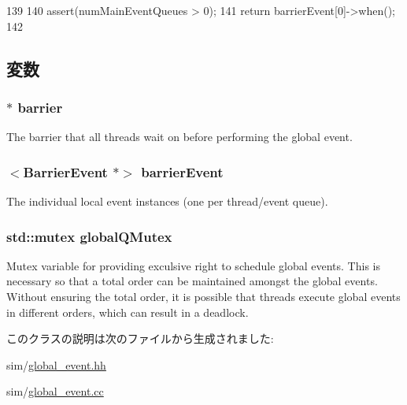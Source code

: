 \begin{DoxyCode}
139     {
140         assert(numMainEventQueues > 0);
141         return barrierEvent[0]->when();
142     }
\end{DoxyCode}


\subsection{変数}
\hypertarget{classBaseGlobalEvent_aa7d3601dfe4f1448143811e57bd9ca46}{
\subsubsection[{barrier}]{$\ast$ {\bf barrier}}}
\label{classBaseGlobalEvent_aa7d3601dfe4f1448143811e57bd9ca46}
The barrier that all threads wait on before performing the global event. \hypertarget{classBaseGlobalEvent_a40d3227f068698be5d711619183aedb5}{
\subsubsection[{barrierEvent}]{$<${\bf BarrierEvent} $\ast$$>$ {\bf barrierEvent}}}
\label{classBaseGlobalEvent_a40d3227f068698be5d711619183aedb5}


The individual local event instances (one per thread/event queue). \hypertarget{classBaseGlobalEvent_ab8876bd0359e5a02d1d6abe4b489c9cc}{
\subsubsection[{globalQMutex}]{\setlength{\rightskip}{0pt plus 5cm}std::mutex {\bf globalQMutex}}}
\label{classBaseGlobalEvent_ab8876bd0359e5a02d1d6abe4b489c9cc}
Mutex variable for providing exculsive right to schedule global events. This is necessary so that a total order can be maintained amongst the global events. Without ensuring the total order, it is possible that threads execute global events in different orders, which can result in a deadlock. 

このクラスの説明は次のファイルから生成されました:\begin{DoxyCompactItemize}
\item 
sim/\hyperlink{global__event_8hh}{global\_\-event.hh}\item 
sim/\hyperlink{global__event_8cc}{global\_\-event.cc}\end{DoxyCompactItemize}
